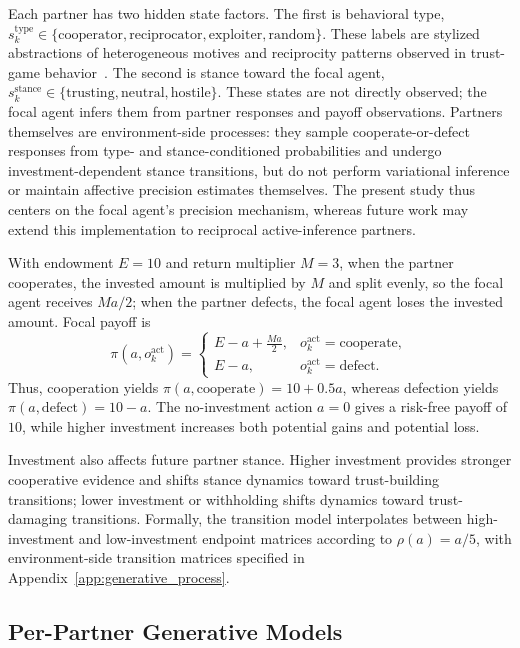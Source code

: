 \documentclass[runningheads,orivec]{llncs}
\begin{document}
Each partner has two hidden state factors. The first is behavioral type, \(s_k^{\mathrm{type}} \in \{\mathrm{cooperator},\mathrm{reciprocator},\mathrm{exploiter},\mathrm{random}\}\). These labels are stylized abstractions of heterogeneous motives and reciprocity patterns observed in trust-game behavior~\cite{Espin2016HeterogeneousMotivesTrust,Smith2013ReciprocityTrustGame}. The second is stance toward the focal agent, \(s_k^{\mathrm{stance}} \in \{\mathrm{trusting},\mathrm{neutral},\mathrm{hostile}\}\). These states are not directly observed; the focal agent infers them from partner responses and payoff observations. Partners themselves are environment-side processes: they sample cooperate-or-defect responses from type- and stance-conditioned probabilities and undergo investment-dependent stance transitions, but do not perform variational inference or maintain affective precision estimates themselves. The present study thus centers on the focal agent's precision mechanism, whereas future work may extend this implementation to reciprocal active-inference partners.

With endowment \(E=10\) and return multiplier \(M=3\), when the partner cooperates, the invested amount is multiplied by \(M\) and split evenly, so the focal agent receives \(Ma/2\); when the partner defects, the focal agent loses the invested amount. Focal payoff is
\[
\pi(a,o_k^{\mathrm{act}})=
\begin{cases}
E-a+\frac{Ma}{2}, & o_k^{\mathrm{act}}=\mathrm{cooperate},\\
E-a, & o_k^{\mathrm{act}}=\mathrm{defect}.
\end{cases}
\]
Thus, cooperation yields \(\pi(a,\mathrm{cooperate})=10+0.5a\), whereas defection yields \(\pi(a,\mathrm{defect})=10-a\). The no-investment action \(a=0\) gives a risk-free payoff of \(10\), while higher investment increases both potential gains and potential loss.

Investment also affects future partner stance. Higher investment provides stronger cooperative evidence and shifts stance dynamics toward trust-building transitions; lower investment or withholding shifts dynamics toward trust-damaging transitions. Formally, the transition model interpolates between high-investment and low-investment endpoint matrices according to \(\rho(a)=a/5\), with environment-side transition matrices specified in Appendix~\ref{app:generative_process}.

\subsection{Per-Partner Generative Models}
\label{sec:partner_models}
\end{document}
